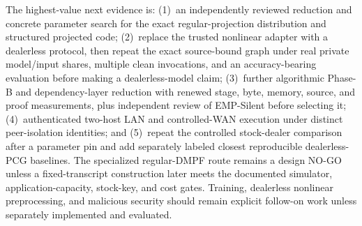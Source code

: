 \documentclass[11pt]{article}
\begin{document}
The highest-value next evidence is:
(1)~an independently reviewed reduction and concrete parameter search for the
exact regular-projection distribution and structured projected code;
(2)~replace the trusted nonlinear adapter with a dealerless protocol, then
repeat the exact source-bound graph under real private model/input shares,
multiple clean invocations, and an accuracy-bearing evaluation before making a
dealerless-model claim;
(3)~further algorithmic Phase-B and dependency-layer reduction with renewed
stage, byte, memory, source, and proof measurements, plus independent review of
EMP-Silent before selecting it;
(4)~authenticated two-host LAN and controlled-WAN execution under distinct
peer-isolation identities; and
(5)~repeat the controlled stock-dealer comparison after a parameter pin and add
separately labeled closest reproducible dealerless-PCG baselines. The
specialized regular-DMPF route remains a design
NO-GO unless a fixed-transcript construction later meets the documented
simulator, application-capacity, stock-key, and cost gates.
Training, dealerless nonlinear preprocessing, and malicious security should
remain explicit follow-on work unless separately implemented and evaluated.
\end{document}
